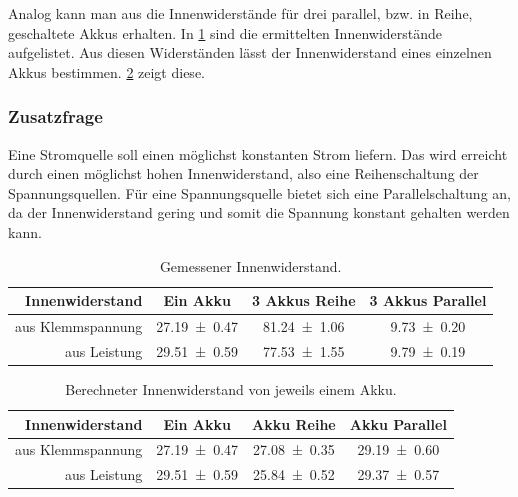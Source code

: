 \documentclass[
	a4paper,
	12pt,
	pagesize,
	ngerman
]{scrartcl}
\begin{document}
	Analog kann man aus  die Innenwiderstände für drei parallel, bzw. in Reihe, geschaltete Akkus erhalten.
	In \cref{Tabelle_Innenwiderstaende} sind die ermittelten Innenwiderstände aufgelistet. 
	Aus diesen Widerständen lässt der Innenwiderstand eines einzelnen Akkus bestimmen.
	\cref{Tabelle_Innenwiderstaende2} zeigt diese. %


	\subsubsection*{Zusatzfrage}
	Eine Stromquelle soll einen möglichst konstanten Strom liefern. Das wird erreicht durch einen möglichst hohen Innenwiderstand, also eine Reihenschaltung der Spannungsquellen. Für eine Spannungsquelle bietet sich eine Parallelschaltung an, da der Innenwiderstand gering und somit die Spannung konstant gehalten werden kann.
	\begin{table}[tb]
		\centering
		\begin{tabular}{ r | c | c | c}
			Innenwiderstand& Ein Akku & 3 Akkus Reihe & 3 Akkus Parallel \\ \hline
			aus Klemmspannung& \SI{27,19 \pm 0,47 }{\Omega}& \SI{81,24 \pm 1,06 }{\Omega}&  \SI{9,73 \pm 0,20 }{\Omega} \\
			aus Leistung & \SI{29,51 \pm 0,59 }{\Omega}&  \SI{77,53 \pm 1,55 }{\Omega}&  \SI{9,79 \pm 0,19 }{\Omega}\\

		\end{tabular}
		\caption{Gemessener Innenwiderstand.} %
		\label{Tabelle_Innenwiderstaende} 
	\end{table}
	\begin{table}[tb]
		\centering
		\begin{tabular}{ r | c | c | c}
			Innenwiderstand& Ein Akku & Akku Reihe & Akku Parallel \\ \hline
			aus Klemmspannung& \SI{27,19 \pm 0,47 }{\Omega}& \SI{27,08 \pm 0,35 }{\Omega}&  \SI{29,19 \pm 0,60 }{\Omega} \\
			aus Leistung & \SI{29,51 \pm 0,59 }{\Omega}&  \SI{25,84 \pm 0,52 }{\Omega}&  \SI{29,37 \pm 0,57 }{\Omega}\\

		\end{tabular}
		\caption{Berechneter Innenwiderstand von jeweils einem Akku.} %
		\label{Tabelle_Innenwiderstaende2} 
	\end{table}
\end{document}

